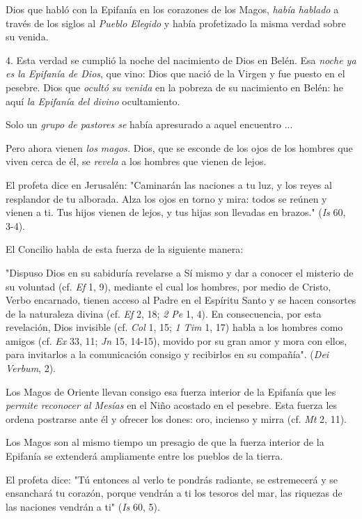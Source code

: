 \begin{body}
Dios que habló con la Epifanía en los corazones de los Magos, \emph{había hablado} a través de los siglos al \emph{Pueblo Elegido} y había profetizado la misma verdad sobre su venida.

4. Esta verdad se cumplió la noche del nacimiento de Dios en Belén. Esa \emph{noche ya es la Epifanía de Dios}, que vino: Dios que nació de la Virgen y fue puesto en el pesebre. Dios que \emph{ocultó su venida} en la pobreza de su nacimiento en Belén: he aquí \emph{la Epifanía del divino} ocultamiento.

Solo un \emph{grupo de pastores se} había apresurado a aquel encuentro ...

Pero ahora vienen \emph{los magos.} Dios, que se esconde de los ojos de los hombres que viven cerca de él, se \emph{revela} a los hombres que vienen de lejos.

El profeta dice en Jerusalén: "Caminarán las naciones a tu luz, y los reyes al resplandor de tu alborada. Alza los ojos en torno y mira: todos se reúnen y vienen a ti. Tus hijos vienen de lejos, y tus hijas son llevadas en brazos." (\emph{Is} 60, 3-4).

El Concilio habla de esta fuerza de la siguiente manera:

"Dispuso Dios en su sabiduría revelarse a Sí mismo y dar a conocer el misterio de su voluntad (cf. \emph{Ef} 1, 9), mediante el cual los hombres, por medio de Cristo, Verbo encarnado, tienen acceso al Padre en el Espíritu Santo y se hacen consortes de la naturaleza divina (cf. \emph{Ef} 2, 18; \emph{2 Pe} 1, 4). En consecuencia, por esta revelación, Dios invisible (cf. \emph{Col} 1, 15; \emph{1 Tim} 1, 17) habla a los hombres como amigos (cf. \emph{Ex} 33, 11; \emph{Jn} 15, 14-15), movido por su gran amor y mora con ellos, para invitarlos a la comunicación consigo y recibirlos en su compañía". (\emph{Dei Verbum}, 2).

Los Magos de Oriente llevan consigo esa fuerza interior de la Epifanía que les \emph{permite reconocer al Mesías} en el Niño acostado en el pesebre. Esta fuerza les ordena postrarse ante él y ofrecer los dones: oro, incienso y mirra (cf. \emph{Mt} 2, 11).

Los Magos son al mismo tiempo un presagio de que la fuerza interior de la Epifanía se extenderá ampliamente entre los pueblos de la tierra.

El profeta dice: "Tú entonces al verlo te pondrás radiante, se estremecerá y se ensanchará tu corazón, porque vendrán a ti los tesoros del mar, las riquezas de las naciones vendrán a ti" (\emph{Is} 60, 5).


\end{body}
